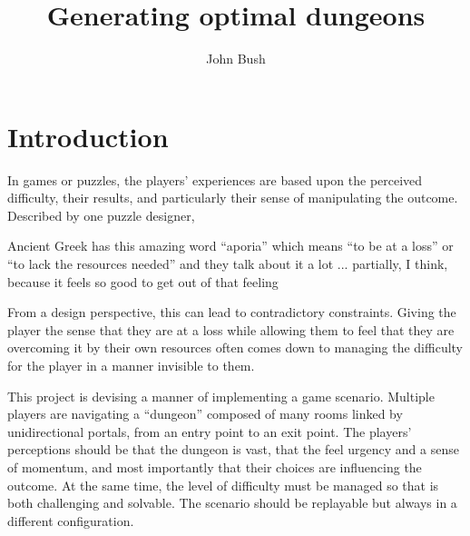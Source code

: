 \documentclass[landscape, a0, final]{a0poster}
\title{Generating optimal dungeons}
\author{John Bush}
\begin{document}
 


\begin{minipage}{0.20\linewidth}

\section{Introduction} 
In games or puzzles, the players' experiences are based upon the perceived difficulty, their results, and particularly their sense of manipulating the outcome.  Described by one puzzle designer\footnotemark , 
    \begin{displayquote} 
        Ancient Greek has this amazing word ``aporia'' which means ``to be at a loss'' or ``to lack the resources needed'' and they talk about it a lot ... partially, I think, because it feels so good to get out of that feeling
    \end{displayquote} 
    From a design perspective, this can lead to contradictory constraints.  Giving the player the sense that they are at a loss while allowing them to feel that they are overcoming it by their own resources often comes down to managing the difficulty for the player in a manner invisible to them. 

This project is devising a manner of implementing a game scenario.  Multiple players are navigating a ``dungeon'' composed of many rooms linked by unidirectional portals, from an entry point to an exit point.  The players' perceptions should be that the dungeon is vast, that the feel urgency and a sense of momentum, and most importantly that their choices are influencing the outcome.  At the same time, the level of difficulty must be managed so that is both challenging and solvable.  The scenario should be replayable but always in a different configuration.


\end{minipage}
\end{document}
